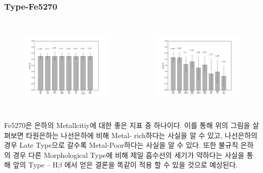 \documentclass[xcolor={dvipsnames,table}]{beamer}
\newcommand\SSM{\fontsize{7}{7.2}\selectfont}
\begin{document}
\begin{frame}
 \frametitle{Type-Fe5270}
 \SSM
  \begin{columns}[t]
   \begin{figure}
    \centering
    \includegraphics[width=6cm, height=4cm]{elfe.png}
   \end{figure}
   \begin{figure}
    \centering
    \includegraphics[width=6cm, height=4cm]{spfe.png}
   \end{figure}
  \end{columns}
\vspace{0.2cm}
Fe5270은 은하의 Metallcitiy에 대한 좋은 지표 중 하나이다. 이를 통해 위의 그림을 살펴보면 타원은하는 나선은하에 비해 Metal-
rich하다는 사실을 알 수 있고, 나선은하의 경우 Late Type으로 갈수록 Metal-Poor하다는 사실을 알 수 있다. 또한 불규칙 은하의
경우 다른 Morphological Type에 비해 제일 흡수선의 세기가 약하다는 사실을 통해 앞의 Type – H$\beta$ 에서 얻은 결론을 똑같이 적용
할 수 있을 것으로 예상된다.
\end{frame}
\end{document}
